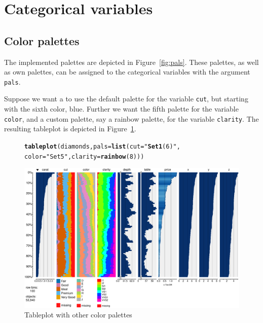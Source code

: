 \documentclass[11pt, fleqn, a4paper]{article}\usepackage{graphicx, color}
\makeatletter
\def\maxwidth{ %
  \ifdim\Gin@nat@width>\linewidth
    \linewidth
  \else
    \Gin@nat@width
  \fi
}
\newcommand{\hlfunctioncall}[1]{\textcolor[rgb]{0.501960784313725,0,0.329411764705882}{\textbf{#1}}}%
\newcommand{\hlstring}[1]{\textcolor[rgb]{0.6,0.6,1}{#1}}%
\newenvironment{kframe}{%
 \def\at@end@of@kframe{}%
 \ifinner\ifhmode%
  \def\at@end@of@kframe{\end{minipage}}%
  \begin{minipage}{\columnwidth}%
 \fi\fi%
 \def\FrameCommand##1{\hskip\@totalleftmargin \hskip-\fboxsep
 \colorbox{shadecolor}{##1}\hskip-\fboxsep
     \hskip-\linewidth \hskip-\@totalleftmargin \hskip\columnwidth}%
 \MakeFramed {\advance\hsize-\width
   \@totalleftmargin\z@ \linewidth\hsize
   \@setminipage}}%
 {\par\unskip\endMakeFramed%
 \at@end@of@kframe}
\newenvironment{knitrout}{}{} %
\makeatother
\begin{document}
\section{Categorical variables}
\subsection{Color palettes}
The implemented palettes are depicted in Figure~\ref{fig:pals}. These palettes, as well as own palettes, can be assigned to the categorical variables with the argument {\tt pals}.

Suppose we want a to use the default palette for the variable {\tt cut}, but starting with the sixth color, blue. Further we want the fifth palette for the variable {\tt color}, and a custom palette, say a rainbow palette, for the variable {\tt clarity}. The resulting tableplot is depicted in Figure~\ref{fig:tp5}.


\begin{figure}[htp]
\begin{knitrout}
\color{fgcolor}\begin{kframe}
\begin{alltt}
\hlfunctioncall{tableplot}(diamonds, pals = \hlfunctioncall{list}(cut = \hlstring{"\hlfunctioncall{Set1}(6)"}, 
    color = \hlstring{"Set5"}, clarity = \hlfunctioncall{rainbow}(8)))
\end{alltt}
\end{kframe}
\includegraphics[width=\maxwidth]{figure/chunk7} 

\end{knitrout}

\caption{Tableplot with other color palettes}
\label{fig:tp5}
\end{figure}
\end{document}
